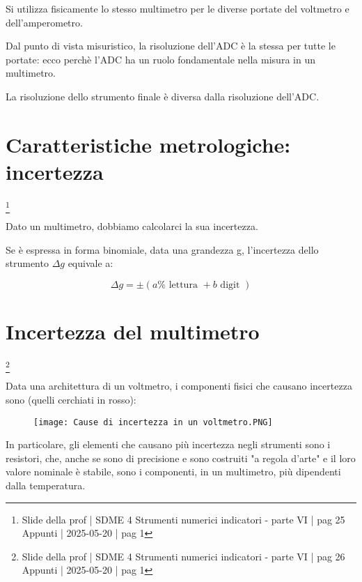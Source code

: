 Si utilizza fisicamente lo stesso multimetro per le diverse portate del voltmetro e dell'amperometro. \newline 

Dal punto di vista misuristico, la risoluzione dell'ADC è la stessa per tutte le portate:
ecco perchè l'ADC ha un ruolo fondamentale nella misura in un multimetro. \newline 

La risoluzione dello strumento finale è diversa dalla risoluzione dell'ADC. \newline 


\newpage 

\section{Caratteristiche metrologiche: incertezza}
\footnote{Slide della prof | SDME 4 Strumenti numerici indicatori - parte VI | pag 25 \\  
Appunti | 2025-05-20 | pag 1}

Dato un multimetro, dobbiamo calcolarci la sua incertezza. \newline 

Se è espressa in forma binomiale, data una grandezza g, l'incertezza dello strumento $\Delta g$ equivale a: 

{
    \Large 
    \begin{equation}
        \Delta g 
        = 
        \pm 
        (a \% \text{ lettura } + b \text{ digit })
    \end{equation}
}

\newpage 

\section{Incertezza del multimetro}
\footnote{Slide della prof | SDME 4 Strumenti numerici indicatori - parte VI | pag 26 \\  
Appunti | 2025-05-20 | pag 1}

Data una architettura di un voltmetro, 
i componenti fisici che causano incertezza sono (quelli cerchiati in rosso): 

\begin{figure}[h]
    \centering
    \texttt{[image: Cause di incertezza in un voltmetro.PNG]}
\end{figure}

In particolare, gli elementi che causano più incertezza negli strumenti sono i resistori, 
che, anche se sono di precisione e sono costruiti "a regola d'arte" e il loro valore nominale è stabile, 
sono i componenti, in un multimetro, più dipendenti dalla temperatura. \newline 

